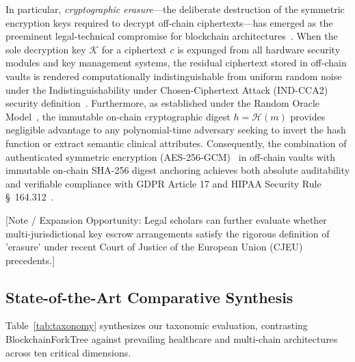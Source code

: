 In particular, \textit{cryptographic erasure}—the deliberate destruction of the symmetric encryption keys required to decrypt off-chain ciphertexts—has emerged as the preeminent legal-technical compromise for blockchain architectures~\cite{politou2018forgetting, sharma2020security}. When the sole decryption key $\mathcal{K}$ for a ciphertext $c$ is expunged from all hardware security modules and key management systems, the residual ciphertext stored in off-chain vaults is rendered computationally indistinguishable from uniform random noise under the Indistinguishability under Chosen-Ciphertext Attack (IND-CCA2) security definition~\cite{bellare2000authenticated}. Furthermore, as established under the Random Oracle Model~\cite{bellare1993random}, the immutable on-chain cryptographic digest $h = \mathcal{H}(m)$ provides negligible advantage to any polynomial-time adversary seeking to invert the hash function or extract semantic clinical attributes. Consequently, the combination of authenticated symmetric encryption (AES-256-GCM)~\cite{dworkin2007recommendation} in off-chain vaults with immutable on-chain SHA-256 digest anchoring achieves both absolute auditability and verifiable compliance with GDPR Article 17 and HIPAA Security Rule \S~164.312~\cite{hipaa1996}.

[Note / Expansion Opportunity: Legal scholars can further evaluate whether multi-jurisdictional key escrow arrangements satisfy the rigorous definition of 'erasure' under recent Court of Justice of the European Union (CJEU) precedents.]

\subsection{State-of-the-Art Comparative Synthesis}
Table~\ref{tab:taxonomy} synthesizes our taxonomic evaluation, contrasting BlockchainForkTree against prevailing healthcare and multi-chain architectures across ten critical dimensions.


